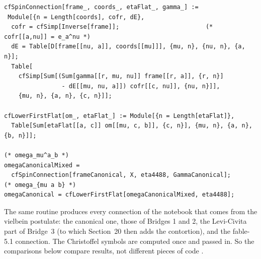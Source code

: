 {\scriptsize
\begin{verbatim}
cfSpinConnection[frame_, coords_, etaFlat_, gamma_] :=
 Module[{n = Length[coords], cofr, dE},
  cofr = cfSimp[Inverse[frame]];                        (* cofr[[a,nu]] = e_a^nu *)
  dE = Table[D[frame[[nu, a]], coords[[mu]]], {mu, n}, {nu, n}, {a, n}];
  Table[
    cfSimp[Sum[(Sum[gamma[[r, mu, nu]] frame[[r, a]], {r, n}]
                - dE[[mu, nu, a]]) cofr[[c, nu]], {nu, n}]],
    {mu, n}, {a, n}, {c, n}]];

cfLowerFirstFlat[om_, etaFlat_] := Module[{n = Length[etaFlat]},
  Table[Sum[etaFlat[[a, c]] om[[mu, c, b]], {c, n}], {mu, n}, {a, n}, {b, n}]];

(* omega_mu^a_b *)
omegaCanonicalMixed =
  cfSpinConnection[frameCanonical, X, eta4488, GammaCanonical];
(* omega_{mu a b} *)
omegaCanonical = cfLowerFirstFlat[omegaCanonicalMixed, eta4488];
\end{verbatim}
}

The same routine produces every connection of the notebook that comes from the vielbein
postulate: the canonical one, those of Bridges 1 and 2, the Levi-Civita part  of
Bridge~3 (to which Section~20 then adds the contortion), and the fable-5.1 connection. The
Christoffel symbols are computed once and passed in. So the comparisons below compare results, not
different pieces of code .

